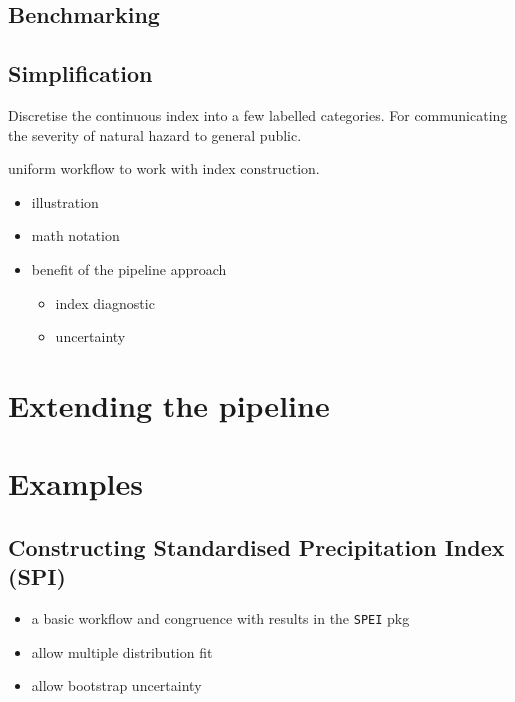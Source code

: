 \documentclass[
]{article}
\providecommand{\tightlist}{%
  \setlength{\itemsep}{0pt}\setlength{\parskip}{0pt}}\usepackage{longtable,booktabs,array}
\begin{document}
\hypertarget{benchmarking}{%
\subsection{Benchmarking}\label{benchmarking}}

\hypertarget{simplification}{%
\subsection{Simplification}\label{simplification}}

Discretise the continuous index into a few labelled categories. For
communicating the severity of natural hazard to general public.

uniform workflow to work with index construction.

\begin{itemize}
\tightlist
\item
  illustration
\item
  math notation
\item
  benefit of the pipeline approach

  \begin{itemize}
  \tightlist
  \item
    index diagnostic
  \item
    uncertainty
  \end{itemize}
\end{itemize}

\hypertarget{extending-the-pipeline}{%
\section{Extending the pipeline}\label{extending-the-pipeline}}

\hypertarget{examples}{%
\section{Examples}\label{examples}}

\hypertarget{constructing-standardised-precipitation-index-spi}{%
\subsection{Constructing Standardised Precipitation Index
(SPI)}\label{constructing-standardised-precipitation-index-spi}}

\begin{itemize}
\tightlist
\item
  a basic workflow and congruence with results in the \texttt{SPEI} pkg
\item
  allow multiple distribution fit
\item
  allow bootstrap uncertainty
\end{itemize}
\end{document}
